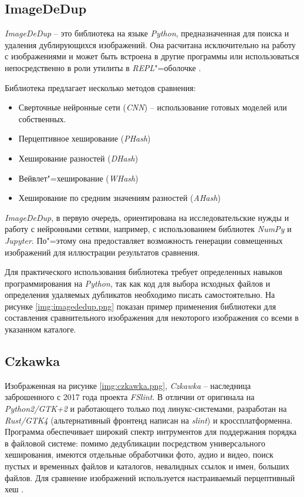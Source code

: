 \documentclass[variant=courcework]{bsuir}
\begin{document}
\subsection{ImageDeDup}
\textit{ImageDeDup} -- это библиотека на языке \textit{Python}, предназначенная
для поиска и удаления дублирующихся изображений. Она расчитана исключительно на
работу с изображениями и может быть встроена в другие программы или
использоваться непосредственно в роли утилиты в \textit{REPL}"=оболочке
\cite{about-imagededup}.

Библиотека предлагает несколько методов сравнения:

\begin{itemize}
    \item Сверточные нейронные сети (\textit{CNN}) -- использование готовых моделей
          или собственных.
    \item Перцептивное хеширование (\textit{PHash})
    \item Хеширование разностей (\textit{DHash})
    \item Вейвлет"=хеширование (\textit{WHash})
    \item Хеширование по средним значениям разностей (\textit{AHash})
\end{itemize}

\textit{ImageDeDup}, в первую очередь, ориентирована на исследовательские нужды
и работу с нейронными сетями, например, с использованием библиотек
\textit{NumPy} и \textit{Jupyter}. По"=этому она предоставляет возможность
генерации совмещенных изображений для иллюстрации результатов сравнения.

Для практического использования библиотека требует определенных навыков
программирования на \textit{Python}, так как код для выбора исходных файлов и
определения удаляемых дубликатов необходимо писать самостоятельно. На рисунке
\ref{img:imagededup.png} показан пример применения библиотеки для составления
сравнительного изображения для некоторого изображения со всеми в указанном
каталоге.


\subsection{Czkawka}
Изображенная на рисунке \ref{img:czkawka.png}, \textit{Czkawka} -- наследница
заброшенного с 2017 года проекта \textit{FSlint}. В отличии от оригинала на
\textit{Python2/GTK+2} и работающего только под линукс-системами, разработан на
\textit{Rust/GTK4} (альтернативный фронтенд написан на \textit{slint}) и
кроссплатформенна. Программа обеспечивает широкий спектр интрументов для
поддержания порядка в файловой системе: помимо дедубликации посредством
универсального хеширования, имеются отдельные обработчики фото, аудио и видео,
поиск пустых и временных файлов и каталогов, невалидных ссылок и имен, больших
файлов. Для сравнение изображений используется настраиваемый перцептивный хеш
\cite{about-czkawka}.
\end{document}
